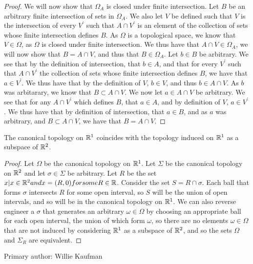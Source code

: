 \begin{proof}
  We will now show that $\Omega_A$ is closed under finite
  intersection. Let $B$ be an arbitrary finite intersection of sets in
  $\Omega_A$. We also let $V$ be defined such that $V$ is the
  intersection of every $V^\prime$ such that $A\cap V^\prime$ is an
  element of the collection of sets whose finite intersection defines
  $B$. As $\Omega$ is a topological space, we know that $V\in \Omega$,
  as $\Omega$ is closed under finite intersection. We thus have that
  $A\cap V \in \Omega_A$, we will now show that $B =A\cap V$, and thus
  that $B\in \Omega_A$. Let $b \in B$ be arbitrary. We see that by the
  definition of intersection, that $b \in A$, and that for every
  $V^\prime$ such that $A\cap V^\prime$ the collection of sets whose
  finite intersection defines $B$, we have that $a \in V^\prime$. We
  thus have that by the definition of $V$, $b\in V$, and thus $b \in A
  \cap V$. As $b$ was arbitarary, we know that $B \subset A \cap
  V$. We now let $a \in A \cap V$ be arbitrary. We see that for any $A
  \cap V^\prime$ which defines $B$, that $a \in A$, and by definition
  of $V$, $a \in V^\prime$. We thus have that by definition of
  intersection, that $a \in B$, and as $a$ was arbitrary, and 
  $B \subset A \cap V$, we have that $B = A \cap V$.
  
  
\end{proof}

\begin{majorEx}%
The canonical topology on $\mathbb{R}^1$ coincides with the topology induced on $\mathbb{R}^1$ as a subspace of $\mathbb{R}^2$.
\end{majorEx}
\begin{proof}
Let $\Omega$ be the canonical topology on $\mathbb{R}^1$. Let $\Sigma$ be the canonical topology on $\mathbb{R}^2$
and let $\sigma \in \Sigma$ be arbitrary. Let $R$ be the set ${x | x \in \mathbb{R}^2 and x = (R, 0) for some R \in \mathbb{R}}$. Consider the set $S = {R \cap \sigma}$. Each ball that forms $\sigma$ intersects $R$ for some open interval, so $S$ will be the union of open intervals, and so will be in the canonical topology on $\mathbb{R}^1$. We can also reverse engineer a $\sigma$ that generates an arbitrary $\omega \in \Omega$ by choosing an appropriate ball for each open interval, the union of which form $\omega$, so there are no elements $\omega \in \Omega$ that are not induced by considering $\mathbb{R}^1$ as a subspace of $\mathbb{R}^2$, and so the sets $\Omega$ and $\Sigma_R$ are equivalent.
\end{proof}

Primary author: Willie Kaufman

